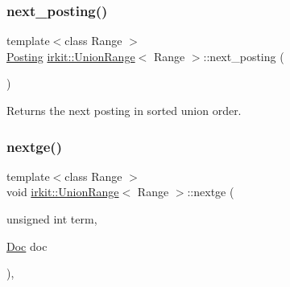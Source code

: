 \mbox{\label{classirkit_1_1UnionRange_aedb2ab6f4a5f0b9f57cf2c55214ed42e}} 
\subsubsection{\texorpdfstring{next\+\_\+posting()}{next\_posting()}}
{\footnotesize\ttfamily template$<$class Range $>$ \\
\mbox{\hyperlink{classirkit_1_1UnionRange_a5f694970419f5a60d7fd41d740556229}{Posting}} \mbox{\hyperlink{classirkit_1_1UnionRange}{irkit\+::\+Union\+Range}}$<$ Range $>$\+::next\+\_\+posting (\begin{DoxyParamCaption}{ }\end{DoxyParamCaption})\hspace{0.3cm}{\ttfamily [inline]}}



Returns the next posting in sorted union order. 

\mbox{\label{classirkit_1_1UnionRange_ab0548ed7d94aece8f72d0ca4db65b456}} 
\subsubsection{\texorpdfstring{nextge()}{nextge()}}
{\footnotesize\ttfamily template$<$class Range $>$ \\
void \mbox{\hyperlink{classirkit_1_1UnionRange}{irkit\+::\+Union\+Range}}$<$ Range $>$\+::nextge (\begin{DoxyParamCaption}\item[{unsigned int}]{term,  }\item[{\mbox{\hyperlink{classirkit_1_1UnionRange_a387589b1f09868b60485c4ab8c61f97a}{Doc}}}]{doc }\end{DoxyParamCaption})\hspace{0.3cm}{\ttfamily [inline]}, {\ttfamily [protected]}}

\mbox{\label{classirkit_1_1UnionRange_a5c2f9a6ec77c812febdf1778e4b9b3f6}} 

